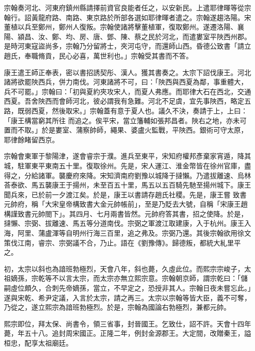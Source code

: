\begin{pinyinscope}
 宗翰奏河北、河東府鎮州縣請擇前資官良能者任之，以安新民。上遣耶律暉等從宗翰行。詔黃龍府路、南路、東京路於所部各選如耶律暉者遣之。宗翰遂趨洛陽。宋董植以兵至鄭州，鄭州人復叛。宗翰使諸將擊董植軍，復取鄭州。遂遷洛陽、襄陽、潁昌、汝、鄭、均、房、唐、鄧、陳、蔡之民於河北，而遣婁室平陜西州郡。
 是時河東寇盜尚多，宗翰乃分留將士，夾河屯守，而還師山西。昏德公致書「請立趙氏，奉職脩貢，民心必喜，萬世利也。」宗翰受其書而不答。



 康王遣王師正奉表，密以書招誘契彤、漢人。獲其書奏之。太宗下詔伐康王。河北諸將欲罷陜西兵，併力南伐。河東諸將不可，曰：「陜西與西夏為鄰，事重體大，兵不可罷。」宗翰曰：「初與夏約夾攻宋人，而夏人弗應。而耶律大石在西北，交通西夏。吾舍陜西而會師河北，彼必謂我有急難。河北不足虞，宜先事陜西，略定五路，既弱西夏，然後取宋。」宗翰蓋有意于夏人也。議久不決，奏請于上，上曰：「康王構當窮其所往
 而追之。俟平宋，當立籓輔如張邦昌者。陜右之地，亦未可置而不取。」於是婁室、蒲察帥師，繩果、婆盧火監戰，平陜西。銀術可守太原，耶律餘睹留西京。



 宗翰會東軍于黎陽津，遂會睿宗于濮。進兵至東平，宋知府權邦彥棄家宵遁，降其城，駐軍東平東南五十里。復取徐州。先是，宋人運江、淮金幣皆在徐州官庫，盡得之，分給諸軍。襲慶府來降。宋知濟南府劉豫以城降于撻懶。乃遣拔離速、烏林荅泰欲、馬五襲康王于揚州，未至百五十里，馬五以五百騎先馳至揚州城下。康王聞兵來，已於前一夕渡江矣。於是，康王以書請存趙氏社稷。先是，康王嘗
 致書元帥府，稱「大宋皇帝構致書大金元帥帳前」，至是乃貶去大號，自稱「宋康王趙構謹致書元帥閤下」。其四月、七月兩書皆然。元帥府答其書，招之使降。於是，撻懶、宗弼、拔離速、馬五等分道南伐。宗弼之軍渡江取建康，入于杭州。康王入海，阿里、蒲盧渾等自明州行海三百里，追之弗及。宗弼乃還。其後宗翰欲用徐文策伐江南，睿宗、宗弼議不合，乃止。語在《劉豫傳》。歸德叛，都統大糺里平之。



 初，太宗以斜也為諳班勃極烈，天會八年，斜也薨，久虛此位。而熙宗宗峻子，太祖嫡孫，宗乾等不以言太宗，而太宗亦無立熙宗意。宗翰朝京師，謂宗乾曰：「儲
 嗣虛位頗久，合刺先帝嫡孫，當立，不早定之，恐授非其人。宗翰日夜未嘗忘此。」遂與宋乾、希尹定議，入言於太宗，請之再三。太宗以宗翰等皆大臣，義不可奪，乃從之，遂立熙宗為諳班勃極烈。於是，宗翰為國論右勃極烈，兼都元帥。



 熙宗即位，拜太保、尚書令，領三省事，封晉國王。乞致仕，詔不許。天會十四年薨，年五十八。追封周宋國正。正隆二年，例封金源郡王。大定間，改贈秦王，謚桓忠，配享太祖廟廷。




\end{pinyinscope}
